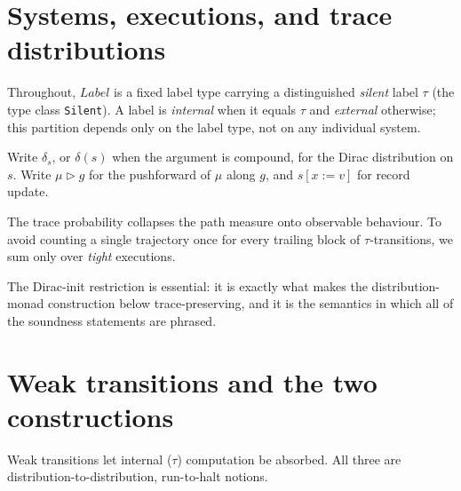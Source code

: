 
\section{Systems, executions, and trace distributions}

Throughout, $Label$ is a fixed label type carrying a distinguished \emph{silent}
label $\tau$ (the type class \texttt{Silent}). A label is \emph{internal} when
it equals $\tau$ and \emph{external} otherwise; this partition depends only on the
label type, not on any individual system.

Write $\delta_s$, or $\delta(s)$ when the argument is compound, for the Dirac
distribution on $s$.
Write $\mu \triangleright g$ for the pushforward of $\mu$ along $g$, and
$s[x := v]$ for record update.









The trace probability collapses the path measure onto observable behaviour. To
avoid counting a single trajectory once for every trailing block of
$\tau$-transitions, we sum only over \emph{tight} executions.







The Dirac-init restriction is essential: it is exactly what makes the
distribution-monad construction below trace-preserving, and it is the semantics in
which all of the soundness statements are phrased.

\section{Weak transitions and the two constructions}

Weak transitions let internal ($\tau$) computation be absorbed. All three are
distribution-to-distribution, run-to-halt notions.





